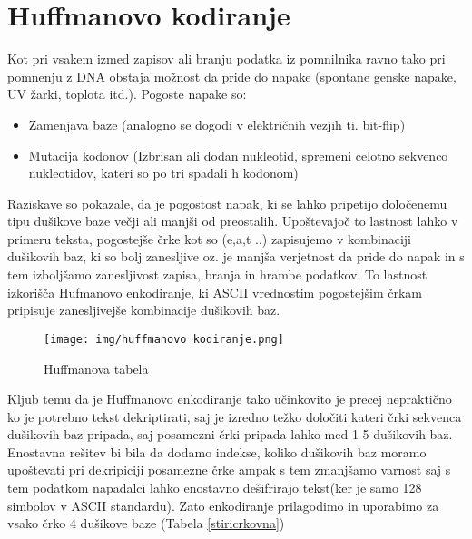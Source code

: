 \documentclass[graybox, envcountchap]{svmult}
\begin{document}
\section{Huffmanovo kodiranje}
 Kot pri vsakem izmed zapisov ali branju podatka iz pomnilnika ravno tako pri pomnenju z DNA obstaja možnost da pride do napake (spontane genske napake, UV žarki, toplota itd.). 
 Pogoste napake so:
\begin{itemize}
  \item Zamenjava baze (analogno se dogodi v električnih vezjih ti. bit-flip)
  \item Mutacija kodonov (Izbrisan ali dodan nukleotid, spremeni celotno sekvenco nukleotidov, kateri so po tri spadali h kodonom)
\end{itemize}

Raziskave so pokazale, da je pogostost napak, ki se lahko pripetijo določenemu tipu dušikove baze večji ali manjši od preostalih. Upoštevajoč to lastnost lahko v primeru teksta, pogostejše črke kot so (e,a,t ..) zapisujemo v kombinaciji dušikovih baz, ki so bolj zanesljive oz. je manjša verjetnost da pride do napak in s tem izboljšamo zanesljivost zapisa, branja in hrambe podatkov. To lastnost izkorišča Hufmanovo enkodiranje, ki ASCII vrednostim pogostejšim črkam pripisuje zanesljivejše kombinacije dušikovih baz.

\begin{figure}[H]
\centering
\texttt{[image: img/huffmanovo kodiranje.png]}
\caption{Huffmanova tabela}
\label{fig:g0}
\end{figure}

Kljub temu da je Huffmanovo enkodiranje tako učinkovito je precej nepraktično ko je potrebno tekst dekriptirati, saj je izredno težko določiti kateri črki sekvenca dušikovih baz pripada, saj posamezni črki pripada lahko med 1-5 dušikovih baz. Enostavna rešitev bi bila da dodamo indekse, koliko dušikovih baz moramo upoštevati pri dekripiciji posamezne črke ampak s tem zmanjšamo varnost saj s tem podatkom napadalci lahko enostavno dešifrirajo tekst(ker je samo 128 simbolov v ASCII standardu). Zato enkodiranje prilagodimo in uporabimo za vsako črko 4 dušikove baze (Tabela \ref{stiricrkovna})
\end{document}
